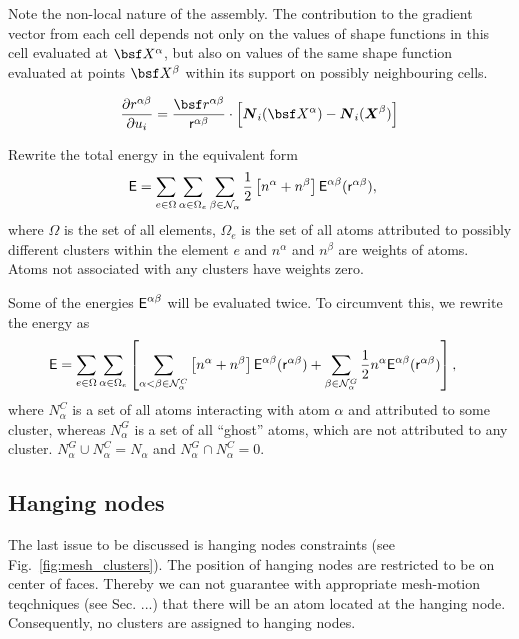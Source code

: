 \documentclass[a4paper,10pt]{article}
\newcommand{\reffig}[1]{Fig.~\ref{fig:#1}}
\def\gz  #1{           \mbox{\boldmath $\mit #1$}}
\def\msf  #1{           \mbox{\!\!      $\sf #1$}}
\def\mcl  #1{               {\cal #1}}
\begin{document}
Note the non-local nature of the assembly. The contribution to the gradient vector from each cell depends not only on the values of shape functions in this cell evaluated at $\bsf X^\alpha$, but also on values of the same shape function evaluated at points $\bsf X^\beta$ within its support on possibly neighbouring cells.

\begin{align}
\frac{\partial r^{\alpha\beta}}{\partial u_i} = \frac{\bsf r^{\alpha\beta}}{\msf r^{\alpha\beta}} \cdot \left[\gz N_i (\bsf X^\alpha) - \gz N_i (\gz X^\beta) \right]
\end{align}


Rewrite the total energy in the equivalent form
\begin{align}
\msf E &= \sum_{e \in \Omega} \sum_{\alpha \in \Omega_e} \sum_{\beta \in \mcl N_\alpha} \frac{1}{2} \left[n^\alpha + n^\beta\right] \msf E^{\alpha \beta} (\msf r^{\alpha\beta}),
\end{align}
where $\Omega$ is the set of all elements, $\Omega_e$ is the set of all atoms attributed to possibly different clusters within the element $e$ and $n^\alpha$ and $n^\beta$ are weights of atoms. Atoms not associated with any clusters have weights zero.


Some of the energies $\msf E^{\alpha\beta}$ will be evaluated twice. To circumvent this, we rewrite the energy as
\begin{align}
\msf E &= \sum_{e \in \Omega} \sum_{\alpha \in \Omega_e}
\left[
\sum_{\alpha < \beta \in \mcl N_\alpha^C} \left[n^\alpha + n^\beta\right] \msf E^{\alpha \beta} (\msf r^{\alpha\beta})
+
\sum_{\beta \in \mcl N_\alpha^G} \frac{1}{2} n^\alpha \msf E^{\alpha \beta} (\msf r^{\alpha\beta})
\right],
\end{align}
where $N_\alpha^C$ is a set of all atoms interacting with atom $\alpha$ and attributed to some cluster, whereas
$N_\alpha^G$ is a set of all ``ghost'' atoms, which are not attributed to any cluster.
$N_\alpha^G \cup N_\alpha^C = N_\alpha$ and $N_\alpha^G \cap N_\alpha^C =  0$.

\subsection{Hanging nodes}

The last issue to be discussed is hanging nodes constraints (see \reffig{mesh_clusters}). The position of hanging nodes are restricted to
be on center of faces. Thereby we can not guarantee with appropriate mesh-motion teqchniques (see Sec. ...) that there will be an atom
located at the hanging node. Consequently, no clusters are assigned to hanging nodes.
\end{document}
